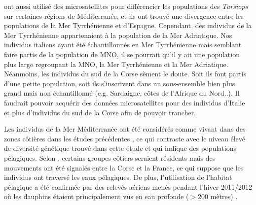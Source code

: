 \documentclass[a4paper,12pt,twoside]{article}\usepackage[]{graphicx}\usepackage[]{color}
\begin{document}
\begin {bibunit} [newbst]
\citet{natoli2005habitat} ont aussi utilisé des microsatellites pour différencier les populations des \emph{Tursiops} sur certaines régions de Méditerranée, et ils ont trouvé une divergence entre les populations de la Mer Tyrrhénienne et d'Espagne. Cependant, des individus de la Mer Tyrrhénienne appartenaient à la population de la Mer Adriatique. Nos individus italiens ayant été échantillonnés en Mer Tyrrhénienne mais semblant faire partis de la population de MNO, il se pourrait qu'il y ait une population plus large regroupant la MNO, la Mer Tyrrhénienne et la Mer Adriatique. Néanmoins, les individus du sud de la Corse sèment le doute. Soit ils font partis d'une petite population, soit ils s'inscrivent dans un sous-ensemble bien plus grand mais non échantillonné (e.g. Sardaigne, côtes de l'Afrique du Nord..). Il faudrait pouvoir acquérir des données microsatellites pour des individus d'Italie et plus d'individus du sud de la Corse afin de pouvoir trancher.

Les individus de la Mer Méditerranée ont été considérés comme vivant dans des zones côtières dans les études précédentes \citep{natoli2004population, natoli2005habitat}, ce qui contraste avec le niveau élevé de diversité génétique trouvé dans cette étude et qui indique des populations pélagiques. Selon \citet{gnone2011distribution}, certains groupes côtiers seraient résidents mais des mouvements ont été signalés entre la Corse et la France, ce qui suppose que les individus ont traversé les eaux pélagiques. De plus, l'utilisation de l'habitat pélagique a été confirmée par des relevés aériens menés pendant l'hiver 2011/2012 où les dauphins étaient principalement vus en eau profonde ($> 200$ mètres) \citep{louis2014}.


\end{bibunit}
\end{document}
